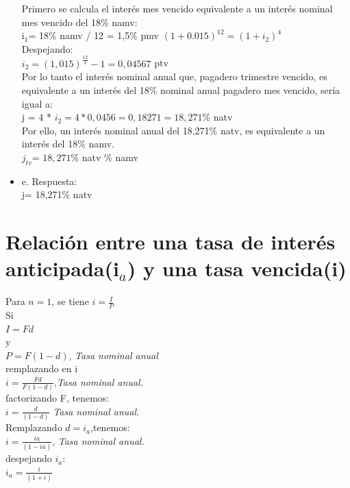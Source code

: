 \begin{itemize}
	Primero se calcula el interés mes vencido equivalente a un interés nominal mes vencido del 18\% namv:\\
	
	i$_{1}$= 18\% namv / 12 = 1,5\% pmv
	$(1+0.015)^{12} = (1+i_{2})^{4}$ \\
	
	Despejando:\\
	
	$i_{2} = (1,015)^{\frac{12}{4}} - 1 = 0,04567$ ptv\\
	
	Por lo tanto el interés nominal anual que, pagadero trimestre vencido, es equivalente a un interés del 18\% nominal anual pagadero mes vencido, sería igual a:\\
	
	j = 4 * $i_{2} = 4 * 0,0456 = 0,18271 = 18,271$\% natv\\
	
	Por ello, un interés nominal anual del 18,271\% natv, es equivalente a un interés del 18\% namv.\\
	
	$j_{tv} $=  $18,271$\% natv \% namv\\
	
	\item e. Respuesta:\\
	
	j= 18,271\% natv\\
	
\end{itemize}

\section{Relación entre una tasa de interés anticipada(i$_{a}$) y una tasa vencida(i)}

Para $n = 1$, se tiene 
$i = \frac{I}{P}$ \\
Si \\
$I = F  d$ \\
y \\
$P = F (1 -d)$, \hspace{35 pt}\textit{Tasa nominal anual}\\
remplazando en i \\
$i = \frac {F d} {F (1-d)}$,\hspace{35 pt}\textit{Tasa nominal anual.}\\
factorizando F, tenemos: \\
$i = \frac{d}{(1 - d)}$ \hspace{35 pt}\textit{Tasa nominal anual.}\\
Remplazando $d = i_{a} $,tenemos: \\
$i = \frac{ia}{(1 - ia)}$, \hspace{35 pt}\textit{Tasa nominal anual.}\\
despejando $i_{a}$: \\
$i_{a} = \frac{i}{(1+i)}$ \\

